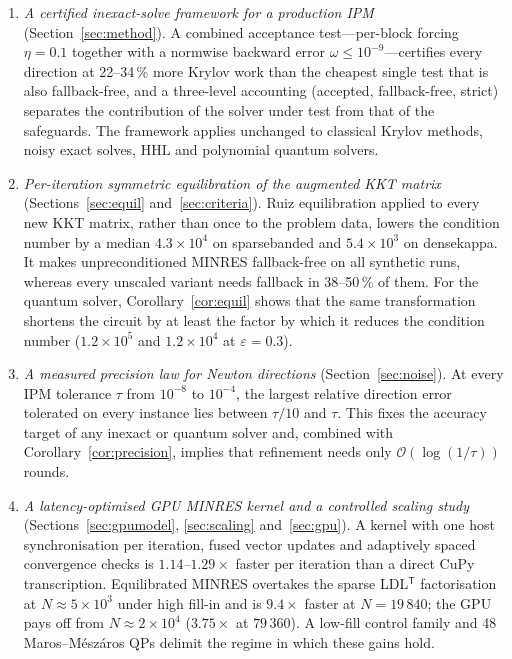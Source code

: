 \documentclass[11pt]{article}
\theoremstyle{definition}
\newcommand{\eps}{\varepsilon}
\newcommand{\T}{^{\mathsf T}}
\newcommand{\bigO}{\mathcal{O}}
\newcommand{\dsus}{\textunderscore\penalty5000\hskip0pt\relax}
\newcommand{\ds}[1]{{\ttfamily\let\_\dsus#1}}
\begin{document}
\begin{enumerate}[leftmargin=2.2em,label=\textbf{C\arabic*.}]
\item \emph{A certified inexact-solve framework for a production IPM} (Section~\ref{sec:method}). A combined acceptance test---per-block forcing $\eta=0.1$ together with a normwise backward error $\omega\le10^{-9}$---certifies every direction at 22--34\,\% more Krylov work than the cheapest single test that is also fallback-free, and a three-level accounting (accepted, fallback-free, strict) separates the contribution of the solver under test from that of the safeguards. The framework applies unchanged to classical Krylov methods, noisy exact solves, HHL and polynomial quantum solvers.
\item \emph{Per-iteration symmetric equilibration of the augmented KKT matrix} (Sections~\ref{sec:equil} and~\ref{sec:criteria}). Ruiz equilibration applied to every new KKT matrix, rather than once to the problem data, lowers the condition number by a median $4.3\times10^{4}$ on \ds{sparse\_banded} and $5.4\times10^{3}$ on \ds{dense\_kappa}. It makes unpreconditioned MINRES fallback-free on all synthetic runs, whereas every unscaled variant needs fallback in 38--50\,\% of them. For the quantum solver, Corollary~\ref{cor:equil} shows that the same transformation shortens the circuit by at least the factor by which it reduces the condition number ($1.2\times10^{5}$ and $1.2\times10^{4}$ at $\eps=0.3$).
\item \emph{A measured precision law for Newton directions} (Section~\ref{sec:noise}). At every IPM tolerance $\tau$ from $10^{-8}$ to $10^{-4}$, the largest relative direction error tolerated on every instance lies between $\tau/10$ and $\tau$. This fixes the accuracy target of any inexact or quantum solver and, combined with Corollary~\ref{cor:precision}, implies that refinement needs only $\bigO(\log(1/\tau))$ rounds.
\item \emph{A latency-optimised GPU MINRES kernel and a controlled scaling study} (Sections~\ref{sec:gpumodel}, \ref{sec:scaling} and~\ref{sec:gpu}). A kernel with one host synchronisation per iteration, fused vector updates and adaptively spaced convergence checks is $1.14$--$1.29\times$ faster per iteration than a direct CuPy transcription. Equilibrated MINRES overtakes the sparse LDL$\T$ factorisation at $N\approx5\times10^{3}$ under high fill-in and is $9.4\times$ faster at $N=19\,840$; the GPU pays off from $N\approx2\times10^{4}$ ($3.75\times$ at $79\,360$). A low-fill control family and 48 Maros--M\'esz\'aros QPs delimit the regime in which these gains hold.

\end{enumerate}
\end{document}
